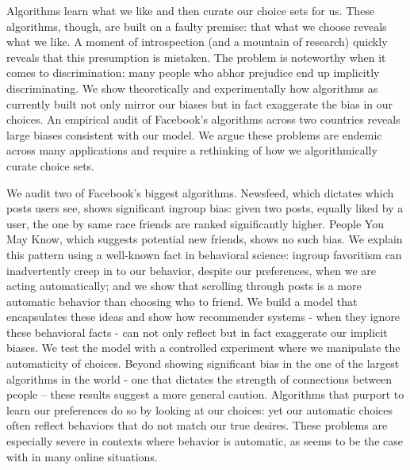 
Algorithms learn what we like and then curate our choice sets for us. These algorithms, though, are built on a faulty premise: that what we choose reveals what we like. A moment of introspection (and a mountain of research) quickly reveals that this presumption is mistaken. The problem is noteworthy when it comes to discrimination: 
many people who abhor prejudice end up implicitly discriminating. We show theoretically and experimentally how algorithms as currently built not only mirror our biases but in fact exaggerate the bias in our choices. An empirical audit of Facebook's algorithms across two countries reveals large biases consistent with our model.  We argue these problems are endemic across many applications and require a rethinking of how we algorithmically curate choice sets.

We audit two of Facebook's biggest algorithms. Newsfeed, which dictates which posts users see, shows significant ingroup bias: given two posts, equally liked by a user, the one by same race friends are ranked significantly higher. People You May Know, which suggests potential new friends, shows no such bias. We explain this pattern using a well-known fact in behavioral science: ingroup favoritism can inadvertently creep in to our behavior, despite our preferences, when we are acting automatically; and we show that scrolling through posts is a more automatic behavior than choosing who to friend. We build a model that encapsulates these ideas and show how recommender systems - when they ignore these behavioral facts - can not only reflect but in fact exaggerate our implicit biases. We test the model with a controlled experiment where we manipulate the automaticity of choices. Beyond showing significant bias in the one of the largest algorithms in the world - one that dictates the strength of connections between people -- these results suggest a more general caution. Algorithms that purport to learn our preferences do so by looking at our choices: yet our automatic choices often reflect behaviors that do not match our true desires. These problems are especially severe in contexts where behavior is automatic, as seems to be the case with in many online situations. 


 
